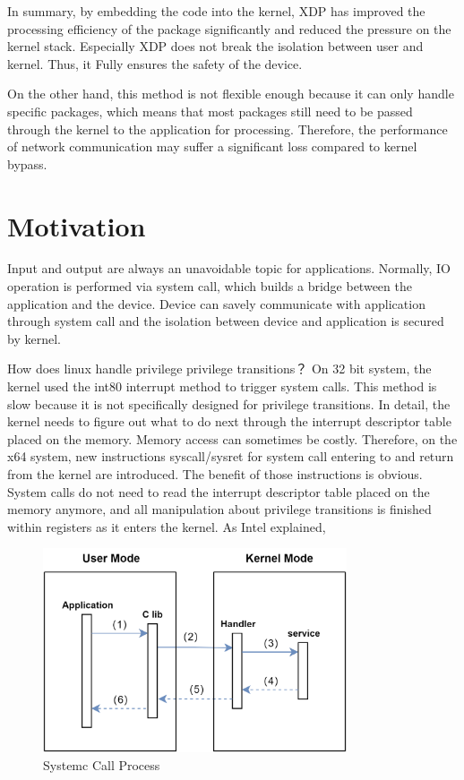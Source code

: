 In summary, by embedding the code into the kernel, XDP has improved the processing efficiency of the 
package significantly and reduced the pressure on the kernel stack. Especially XDP does not break the 
isolation between user and kernel. Thus, it Fully ensures the safety of the device.

On the other hand, this method is not flexible enough because it can only handle specific 
packages, which means that most packages still need to be passed through the kernel to the 
application for processing. Therefore, the performance of network communication may suffer 
a significant loss compared to kernel bypass.

\section{Motivation}
Input and output are always an unavoidable topic for applications. 
Normally, IO operation is performed via system call, which builds 
a bridge between the application and the device. Device can savely 
communicate with application through system call and the isolation 
between device and application is secured by kernel. 

How does linux handle privilege privilege transitions？ 
On 32 bit system, the kernel used the int80 interrupt method 
to trigger system calls. This method is slow because it is 
not specifically designed for privilege transitions. 
In detail, the kernel needs to figure out what to do 
next through the interrupt descriptor table placed on 
the memory. Memory access can sometimes be costly. 
Therefore, on the x64 system, new instructions 
syscall/sysret for system call entering to and return 
from the kernel are introduced. The benefit of those 
instructions is obvious. System calls do not need to read 
the interrupt descriptor table placed on the memory anymore, 
and all manipulation about privilege transitions is finished 
within registers as it enters the kernel. As Intel explained, 

\begin{figure}[tbp]
  \centering
  \includegraphics[width=0.8\textwidth]{images/system_call_process}
  \caption[Short description]{Systemc Call Process}
  \label{fig:system_call_process}
\end{figure}

